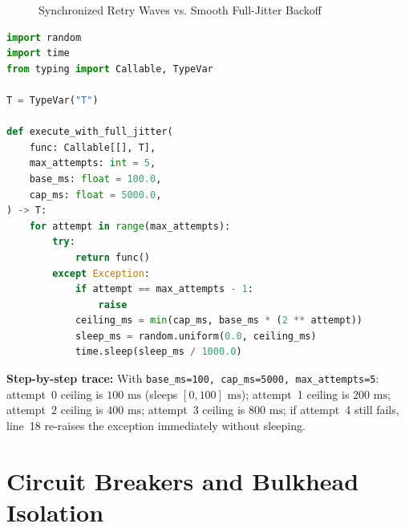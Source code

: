 \begin{figure}[htbp]
\centering
{}
\caption{Synchronized Retry Waves vs. Smooth Full-Jitter Backoff}
\label{fig:v4-ch09-full-jitter}
\end{figure}

\begin{lstlisting}[language=Python, caption={Exponential Backoff with AWS Full Jitter in Python}]
import random
import time
from typing import Callable, TypeVar

T = TypeVar("T")

def execute_with_full_jitter(
    func: Callable[[], T],
    max_attempts: int = 5,
    base_ms: float = 100.0,
    cap_ms: float = 5000.0,
) -> T:
    for attempt in range(max_attempts):
        try:
            return func()
        except Exception:
            if attempt == max_attempts - 1:
                raise
            ceiling_ms = min(cap_ms, base_ms * (2 ** attempt))
            sleep_ms = random.uniform(0.0, ceiling_ms)
            time.sleep(sleep_ms / 1000.0)
\end{lstlisting}

\textbf{Step-by-step trace:} With \texttt{base\_ms=100, cap\_ms=5000, max\_attempts=5}: attempt~0 ceiling is $100\text{ ms}$ (sleeps $[0, 100]\text{ ms}$); attempt~1 ceiling is $200\text{ ms}$; attempt~2 ceiling is $400\text{ ms}$; attempt~3 ceiling is $800\text{ ms}$; if attempt~4 still fails, line~18 re-raises the exception immediately without sleeping.

\section{Circuit Breakers and Bulkhead Isolation}


